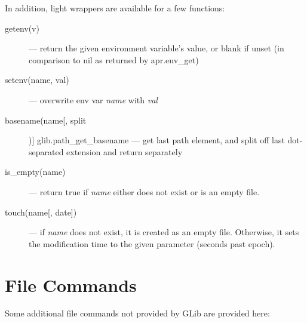 In addition, light wrappers are available for a few functions:

\begin{description}
\item[getenv(v)] --- return the given environment variable's value, or
blank if unset (in comparison to {\ex nil} as returned by {\ex
apr.env\_get})
\item[setenv(name, val)] --- overwrite env var \emph{name} with
\emph{val}
\item[basename(name[, split])] {\ex glib.path\_get\_basename} --- get last
path element, and split off last dot-separated extension and return
separately
\item[is\_empty(name)] --- return true if \emph{name} either does not
exist or is an empty file.
\item[touch(name{[}, date{]})] --- if \emph{name} does not exist, it is
created as an empty file.  Otherwise, it sets the modification time to
the given parameter (seconds past epoch).
\end{description}

\section{File Commands}

Some additional file commands not provided by GLib are provided here:

